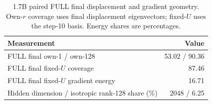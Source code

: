 \begin{table}[!htbp]
\centering
\caption{1.7B paired FULL final displacement and gradient geometry. Own-$r$ coverage uses final displacement eigenvectors; fixed-$U$ uses the step-10 basis. Energy shares are percentages.}
\label{tab:paired_adapter_geometry}
\small
\setlength{\tabcolsep}{3pt}
\begin{tabular}{lr}
\toprule
Measurement & Value \\
\midrule
FULL final own-1 / own-128 & 53.02 / 90.36 \\
FULL final fixed-$U$ coverage & 87.46 \\
FULL final fixed-$U$ gradient energy & 16.71 \\
Hidden dimension / isotropic rank-128 share (\%) & 2048 / 6.25 \\
\bottomrule
\end{tabular}
\end{table}

